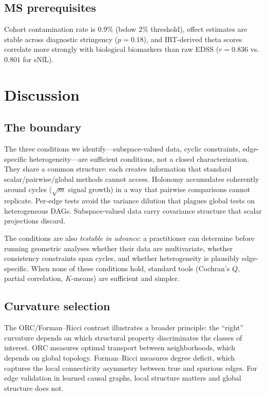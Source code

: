 \documentclass[11pt]{article}
\begin{document}
\subsection{MS prerequisites}

Cohort contamination rate is $0.9\%$ (below 2\% threshold), effect estimates are stable across diagnostic stringency ($p = 0.18$), and IRT-derived theta scores correlate more strongly with biological biomarkers than raw EDSS ($r = 0.836$ vs.\ $0.801$ for sNfL).

\section{Discussion}
\label{sec:discussion}

\subsection{The boundary}

The three conditions we identify---subspace-valued data, cyclic constraints, edge-specific heterogeneity---are sufficient conditions, not a closed characterization.
They share a common structure: each creates information that standard scalar/pairwise/global methods cannot access.
Holonomy accumulates coherently around cycles ($\sqrt{m}$ signal growth) in a way that pairwise comparisons cannot replicate.
Per-edge tests avoid the variance dilution that plagues global tests on heterogeneous DAGs.
Subspace-valued data carry covariance structure that scalar projections discard.

The conditions are also \emph{testable in advance}: a practitioner can determine before running geometric analyses whether their data are multivariate, whether consistency constraints span cycles, and whether heterogeneity is plausibly edge-specific.
When none of these conditions hold, standard tools (Cochran's $Q$, partial correlation, $K$-means) are sufficient and simpler.

\subsection{Curvature selection}

The ORC/Forman--Ricci contrast illustrates a broader principle: the ``right'' curvature depends on which structural property discriminates the classes of interest.
ORC measures optimal transport between neighborhoods, which depends on global topology.
Forman--Ricci measures degree deficit, which captures the local connectivity asymmetry between true and spurious edges.
For edge validation in learned causal graphs, local structure matters and global structure does not.
\end{document}

